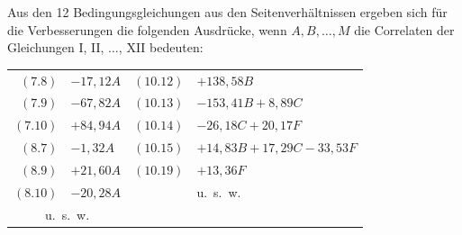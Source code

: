 \documentclass[12pt,a4paper]{article}
\theoremstyle{plain}
\theoremstyle{definition}
\theoremstyle{remark}
\begin{document}
Aus den 12 Bedingungsgleichungen aus den Seitenverh\"altnissen ergeben sich f\"ur die Verbesserungen die folgenden Ausdr\"ucke, wenn $A, B, \ldots, M$ die Correlaten der Gleichungen I, II, $\ldots$, XII bedeuten:

\begin{center}
\begin{tabular}{r@{${}= {}$}l|r@{${}= {}$}l}
$(7.8)$ & $-17{,}12A$ & $(10.12)$ & $+138{,}58B$\\
$(7.9)$ & $-67{,}82A$ & $(10.13)$ & $-153{,}41B + 8{,}89C$\\
$(7.10)$ & $+84{,}94A$ & $(10.14)$ & $-26{,}18C + 20{,}17F$\\
$(8.7)$ & $-1{,}32A$ & $(10.15)$ & $+14{,}83B + 17{,}29C - 33{,}53F$\\
$(8.9)$ & $+21{,}60A$ & $(10.19)$ & $+13{,}36F$\\
$(8.10)$ & $-20{,}28A$ & & u.\ s.\ w.\\
\multicolumn{2}{c|}{u.\ s.\ w.}
\end{tabular}
\end{center}
\end{document}
